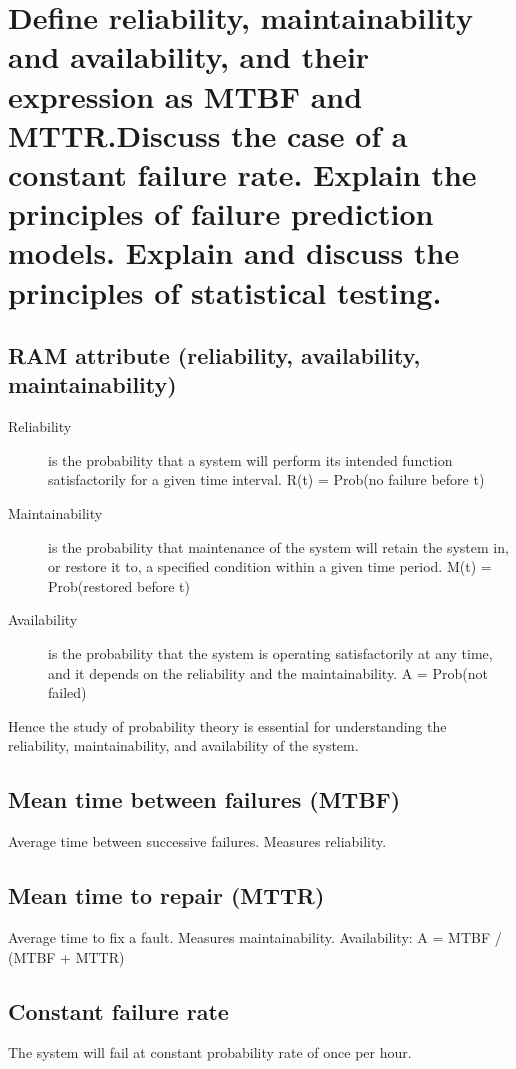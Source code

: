 \clearpage{}
\section{Define reliability, maintainability and availability, and their
expression as MTBF and MTTR.\@ Discuss the case of a constant failure rate.
Explain the principles of failure prediction models. Explain and discuss
the principles of statistical testing.}


\subsection{RAM attribute (reliability, availability, maintainability)}

\begin{description}
    \item[Reliability] is the probability that a system will perform its intended function satisfactorily for a given 
    time interval. R(t) = Prob(no failure before t)
    \item[Maintainability] is the probability that maintenance of the system will retain the system in, or restore it 
    to, a specified condition within a given time period. M(t) = Prob(restored before t)
    \item[Availability] is the probability that the system is operating satisfactorily at any time, and it depends on the reliability and the maintainability.  A = Prob(not failed)
\end{description}

Hence the study of probability theory is essential for understanding the reliability, maintainability, and availability of the system.

\subsection{Mean time between failures (MTBF)}
Average time between successive failures. Measures reliability.

\subsection{Mean time to repair (MTTR)}
Average time to fix a fault. Measures maintainability. \newline
Availability: A = MTBF / (MTBF + MTTR)

\subsection{Constant failure rate}
The system will fail at constant probability rate of once per hour. \newline


